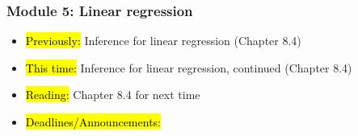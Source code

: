 
\begin{frame}
    \frametitle{Module 5: Linear regression}
    \begin{itemize}
        \item \hl{Previously: }Inference for linear regression (Chapter 8.4)
        \item \hl{This time: }Inference for linear regression, continued (Chapter 8.4)
        \item \hl{Reading: }Chapter 8.4 for next time
        \item \hl{Deadlines/Announcements: }
    \end{itemize}
    
\end{frame}